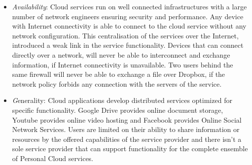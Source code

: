 \begin{itemize}
\item {\it Availability}: Cloud services run on well connected infrastructures
      with a large number of network engineers ensuring security and
      performance. Any device with Internet connectivity is able to connect to
      the cloud service without any network configuration.  This centralisation
      of the services over the Internet, introduced a weak link in the service
      functionality. Devices that can connect directly over a network, 
      will never be able to interconnect and exchange information, if Internet
      connectivity is unavailable.  Two users behind the same firewall will never be able to
      exchange a file over Dropbox, if the network policy forbids any connection
      with the servers of the service. 
\item {\emph Generality}: Cloud applications develop distributed services
      optimized for specific functionality. Google Drive provides online
      document storage, Youtube provides online video hosting and Facebook
      provides Online Social Network Services. Users are limited on their ability
      to share information or resources by the offered capabilities of the
      service provider and there isn't a sole service provider that can
      support functionality for the complete ensemble of Personal Cloud services. 
\end{itemize}

